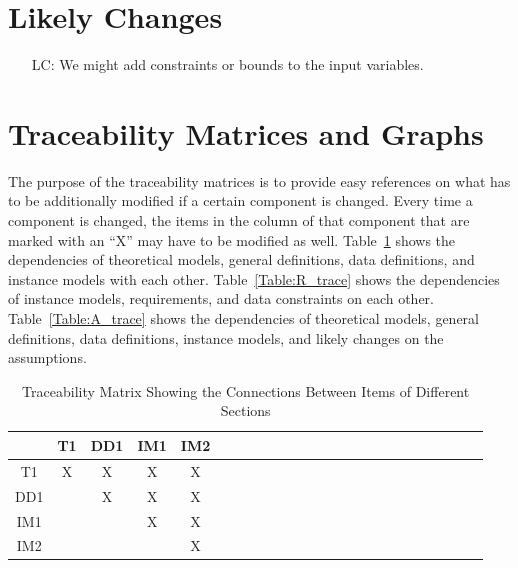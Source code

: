 \documentclass[12pt]{article}
\newcounter{lcnum} %
\begin{document}
\section{Likely Changes}    

\noindent \begin{itemize}

\item[LC\refstepcounter{lcnum}\thelcnum\label{LC_meaningfulLabel}:] We might 
add constraints or bounds to the input variables. 

\end{itemize}

\section{Traceability Matrices and Graphs}

The purpose of the traceability matrices is to provide easy references on what
has to be additionally modified if a certain component is changed.  Every time a
component is changed, the items in the column of that component that are marked
with an ``X'' may have to be modified as well.  Table~\ref{Table:B_trace} shows 
the
dependencies of theoretical models, general definitions, data definitions, and
instance models with each other. Table~\ref{Table:R_trace} shows the
dependencies of instance models, requirements, and data constraints on each
other. Table~\ref{Table:A_trace} shows the dependencies of theoretical models,
general definitions, data definitions, instance models, and likely changes on
the assumptions.\\

\begin{table}[h!]
\centering
\begin{tabular}{|c|c|c|c|c|c|c|c|c|c|c|c|c|c|c|c|c|c|c|c|c|c|c|c|}
\hline        
	& T1& DD1& IM1 & IM2 \\
\hline
T1     &X &X &X &X   \\ \hline
DD1    & &X &X &X  \\ \hline
IM1    & & &X &X  \\ \hline 
IM2    & & & &X    \\ 
\hline
\end{tabular}\\
\caption{Traceability Matrix Showing the Connections Between Items of 
Different 
Sections}
\label{Table:B_trace}
\end{table}
\end{document}
